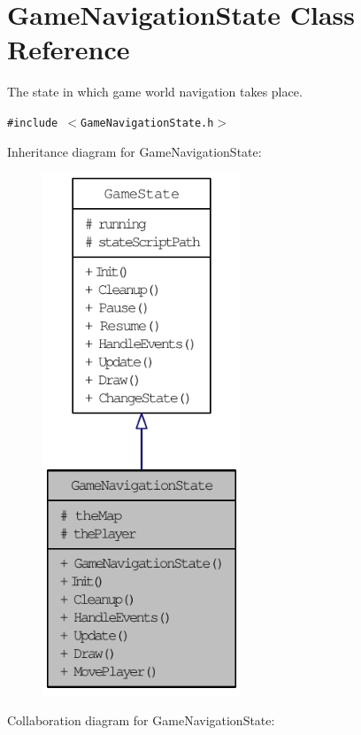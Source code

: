 \hypertarget{class_game_navigation_state}{
\section{GameNavigationState Class Reference}
\label{de/d2a/class_game_navigation_state}
}
The state in which game world navigation takes place.  


{\tt \#include $<$GameNavigationState.h$>$}

Inheritance diagram for GameNavigationState:\nopagebreak
\begin{figure}[H]
\begin{center}
\leavevmode
\includegraphics[width=168pt]{dd/ded/class_game_navigation_state__inherit__graph}
\end{center}
\end{figure}
Collaboration diagram for GameNavigationState:\nopagebreak
